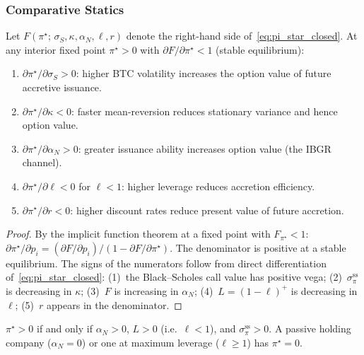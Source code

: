 \subsubsection{Comparative Statics}\label{sec:comparative_statics}

\begin{proposition}
  \label{prop:comp_statics}
  Let $F(\pi^\star;\,\sigma_S,\kappa,\alpha_N,\ell,r)$ denote the
  right-hand side of~\eqref{eq:pi_star_closed}.  At any interior fixed point
  $\pi^\star > 0$ with $\partial F/\partial \pi^\star < 1$ (stable
  equilibrium):
  \begin{enumerate}
    \item $\partial \pi^\star / \partial \sigma_S > 0$:
      higher BTC volatility increases the option value of future accretive
      issuance.
    \item $\partial \pi^\star / \partial \kappa < 0$:
      faster mean-reversion reduces stationary variance and hence option
      value.
    \item $\partial \pi^\star / \partial \alpha_N > 0$:
      greater issuance ability increases option value (the IBGR channel).
    \item $\partial \pi^\star / \partial \ell < 0$ for $\ell < 1$:
      higher leverage reduces accretion efficiency.
    \item $\partial \pi^\star / \partial r < 0$:
      higher discount rates reduce present value of future accretion.
  \end{enumerate}
\end{proposition}

\begin{proof}
  By the implicit function theorem at a fixed point with $F_{\pi^\star} < 1$:
  $\partial \pi^\star / \partial p_i = (\partial F/\partial p_i) /
  (1 - \partial F / \partial \pi^\star)$.
  The denominator is positive at a stable equilibrium.  The signs of the
  numerators follow from direct differentiation
  of~\eqref{eq:pi_star_closed}: (1)~the Black--Scholes call value has
  positive vega; (2)~$\sigma_\pi^{\mathrm{ss}}$ is decreasing in $\kappa$;
  (3)~$F$ is increasing in $\alpha_N$; (4)~$L = (1-\ell)^+$ is decreasing
  in $\ell$; (5)~$r$ appears in the denominator.
\end{proof}

\begin{corollary}
  \label{cor:sign_pistar}
  $\pi^\star > 0$ if and only if $\alpha_N > 0$, $L > 0$ (i.e.\
  $\ell < 1$), and $\sigma_\pi^{\mathrm{ss}} > 0$.
  A passive holding company ($\alpha_N = 0$) or one at maximum leverage
  ($\ell \ge 1$) has $\pi^\star = 0$.
\end{corollary}

